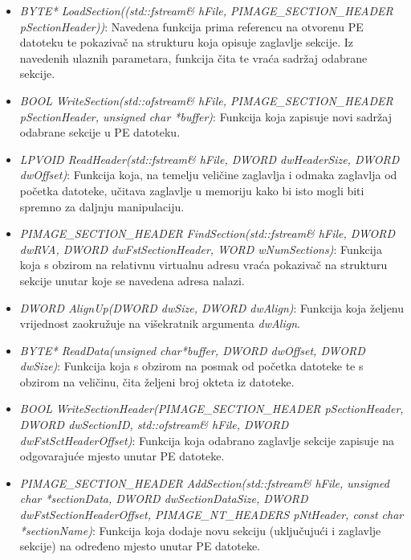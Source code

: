 \documentclass[times, utf8, diplomski, numeric]{fer}
\begin{document}
\begin{itemize}

\item {\footnotesize \emph{BYTE* LoadSection((std::fstream\&
hFile, PIMAGE\_SECTION\_HEADER pSectionHeader))}}: Navedena
funkcija prima referencu na otvorenu PE datoteku te pokazivač na
strukturu koja opisuje zaglavlje sekcije. Iz navedenih ulaznih
parametara, funkcija čita te vraća sadržaj odabrane sekcije.

\item {\footnotesize \emph{BOOL WriteSection(std::ofstream\&
hFile, PIMAGE\_SECTION\_HEADER pSectionHeader, unsigned char
*buffer)}}: Funkcija koja zapisuje novi sadržaj odabrane sekcije
u PE datoteku.

\item {\footnotesize \emph{LPVOID ReadHeader(std::fstream\&
hFile, DWORD dwHeaderSize, DWORD dwOffset)}}: Funkcija koja, na
temelju veličine zaglavlja i odmaka zaglavlja od početka
datoteke, učitava zaglavlje u memoriju kako bi isto mogli biti
spremno za daljnju manipulaciju.

\item {\footnotesize \emph{PIMAGE\_SECTION\_HEADER
FindSection(std::fstream\& hFile, DWORD dwRVA, DWORD
dwFstSectionHeader, WORD wNumSections)}}: Funkcija koja s obzirom
na relativnu virtualnu adresu vraća pokazivač na strukturu
sekcije unutar koje se navedena adresa nalazi.

\item {\footnotesize \emph{DWORD AlignUp(DWORD dwSize, DWORD
dwAlign)}}: Funkcija koja željenu vrijednost zaokružuje na
višekratnik argumenta \emph{dwAlign}.

\item {\footnotesize \emph{BYTE* ReadData(unsigned char*buffer,
DWORD dwOffset, DWORD dwSize)}}: Funkcija koja s obzirom na
posmak od početka datoteke te s obzirom na veličinu, čita željeni
broj okteta iz datoteke.

\item {\footnotesize \emph{BOOL
WriteSectionHeader(PIMAGE\_SECTION\_HEADER pSectionHeader, DWORD
dwSectionID, std::ofstream\& hFile, DWORD
dwFstSctHeaderOffset)}}: Funkcija koja odabrano zaglavlje sekcije
zapisuje na odgovarajuće mjesto unutar PE datoteke.

\item {\footnotesize \emph{PIMAGE\_SECTION\_HEADER
AddSection(std::fstream\& hFile, unsigned char *sectionData,
DWORD dwSectionDataSize, DWORD dwFstSectionHeaderOffset,
PIMAGE\_NT\_HEADERS pNtHeader, const char *sectionName)}}:
Funkcija koja dodaje novu sekciju (uključujući i zaglavlje
sekcije) na određeno mjesto unutar PE datoteke.


\end{itemize}
\end{document}
